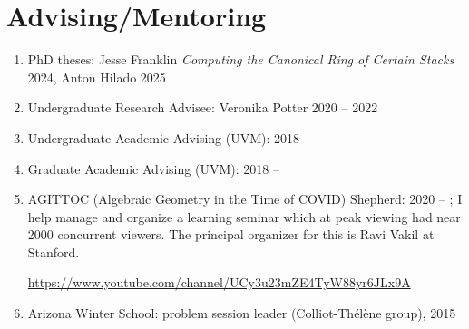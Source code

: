 \documentclass[a4paper,10pt]{article}
\begin{document}
\section*{Advising/Mentoring}
\begin{enumerate}
	\item PhD theses: Jesse Franklin \emph{Computing the Canonical Ring of Certain Stacks} 2024, Anton Hilado 2025
	\item Undergraduate Research Advisee: Veronika Potter  2020 -- 2022
	\item Undergraduate Academic Advising (UVM): 2018 --
	\item Graduate Academic Advising (UVM): 2018 --
	\item AGITTOC (Algebraic Geometry in the Time of COVID) Shepherd: 2020 -- ; I help manage and organize a learning seminar which at peak viewing had near 2000 concurrent viewers. The principal organizer for this is Ravi Vakil at Stanford.
	\begin{center}
			 \url{https://www.youtube.com/channel/UCy3u23mZE4TyW88yr6JLx9A}
	\end{center}
   \item  Arizona Winter School:  problem session leader (Colliot-Th\'{e}l\`ene group),  2015  

\end{enumerate}


\iffalse
\end{document}
